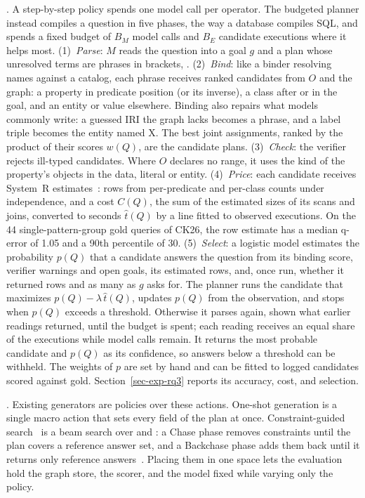 .
A step-by-step policy spends one model call per operator.
The budgeted planner instead compiles a question in five phases, the
way a database compiles SQL, and spends a fixed budget of $B_M$ model
calls and $B_E$ candidate executions where it helps most.
(1)~\emph{Parse}: $M$ reads the question into a goal $g$ and a plan
whose unresolved terms are phrases in brackets, \eg
{}.
(2)~\emph{Bind}: like a binder resolving names against a catalog, each
phrase receives ranked candidates from $O$ and the graph: a property in
predicate position (or its inverse), a class after  or in
the goal, and an entity or value elsewhere.
Binding also repairs what models commonly write: a guessed IRI the graph
lacks becomes a phrase, and a label triple  becomes
the entity named X.
The best joint assignments, ranked by the product of their scores
$w(Q)$, are the candidate plans.
(3)~\emph{Check}: the verifier rejects ill-typed candidates.
Where $O$ declares no range, it uses the kind of the property's objects
in the data, literal or entity.
(4)~\emph{Price}: each candidate receives System~R
estimates~\cite{selinger1979access}: rows from per-predicate and
per-class counts under independence, and a cost $C(Q)$, the sum of the
estimated sizes of its scans and joins, converted to seconds $\hat{t}(Q)$
by a line fitted to observed executions.
On the 44 single-pattern-group gold queries of CK26, the row estimate
has a median q-error of 1.05 and a 90th percentile of 30.
(5)~\emph{Select}: a logistic model estimates the probability $p(Q)$
that a candidate answers the question from its binding score, verifier
warnings and open goals, its estimated rows, and, once run, whether it
returned rows and as many as $g$ asks for.
The planner runs the candidate that maximizes $p(Q) - \lambda\,\hat{t}(Q)$,
updates $p(Q)$ from the observation, and stops when $p(Q)$ exceeds a
threshold.
Otherwise it parses again, shown what earlier readings returned, until
the budget is spent; each reading receives an equal share of the
executions while model calls remain.
It returns the most probable candidate and $p(Q)$ as its confidence,
so answers below a threshold can be withheld.
The weights of $p$ are set by hand and can be fitted to logged
candidates scored against gold.
Section~\ref{sec-exp-rq3} reports its accuracy, cost, and selection.

.
Existing generators are policies over these actions.
One-shot generation is a single macro action that sets every field of
the plan at once.
Constraint-guided search~\cite{wang2026uniqgen} is a beam search over
 and : a Chase phase removes constraints until the
plan covers a reference answer set, and a Backchase phase adds them
back until it returns only reference answers~\cite{deutsch1999chase}.
Placing them in one space lets the evaluation hold the graph store,
the scorer, and the model fixed while varying only the policy.

